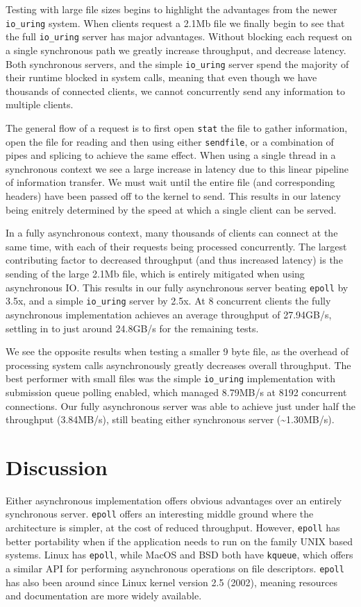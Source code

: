 \documentclass[letterpaper, 10pt, twocolumn]{article}
\begin{document}
Testing with large file sizes begins to highlight the advantages from the newer \texttt{io\_uring} system. When clients request a 2.1Mb file we finally begin to see that the full \texttt{io\_uring} server has major advantages. Without blocking each request on a single synchronous path we greatly increase throughput, and decrease latency. Both synchronous servers, and the simple \texttt{io\_uring} server spend the majority of their runtime blocked in system calls, meaning that even though we have thousands of connected clients, we cannot concurrently send any information to multiple clients.

The general flow of a request is to first open \texttt{stat} the file to gather information, open the file for reading and then using either \texttt{sendfile}, or a combination of pipes and splicing to achieve the same effect. When using a single thread in a synchronous context we see a large increase in latency due to this linear pipeline of information transfer. We must wait until the entire file (and corresponding headers) have been passed off to the kernel to send. This results in our latency being enitrely determined by the speed at which a single client can be served.

In a fully asynchronous context, many thousands of clients can connect at the same time, with each of their requests being processed concurrently. The largest contributing factor to decreased throughput (and thus increased latency) is the sending of the large 2.1Mb file, which is entirely mitigated when using asynchronous IO. This results in our fully asynchronous server beating \texttt{epoll} by 3.5x, and a simple \texttt{io\_uring} server by 2.5x. At 8 concurrent clients the fully asynchronous implementation achieves an average throughput of 27.94GB/s, settling in to just around 24.8GB/s for the remaining tests.

We see the opposite results when testing a smaller 9 byte file, as the overhead of processing system calls asynchronously greatly decreases overall throughput. The best performer with small files was the simple \texttt{io\_uring} implementation with submission queue polling enabled, which managed 8.79MB/s at 8192 concurrent connections. Our fully asynchronous server was able to achieve just under half the throughput (3.84MB/s), still beating either synchronous server (\textasciitilde{}1.30MB/s).
\section{Discussion}
\label{sec:orgeccd18a}
Either asynchronous implementation offers obvious advantages over an entirely synchronous server. \texttt{epoll} offers an interesting middle ground where the architecture is simpler, at the cost of reduced throughput. However, \texttt{epoll} has better portability when if the application needs to run on the family UNIX based systems. Linux has \texttt{epoll}, while MacOS and BSD both have \texttt{kqueue}, which offers a similar API for performing asynchronous operations on file descriptors. \texttt{epoll} has also been around since Linux kernel version 2.5 (2002), meaning resources and documentation are more widely available.
\end{document}
